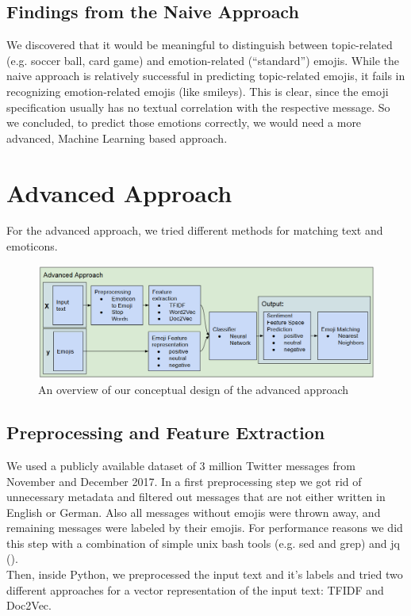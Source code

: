 \documentclass{article}
\begin{document}
\subsection{Findings from the Naive Approach}
We discovered that it would be meaningful to distinguish between topic-related (e.g. soccer ball, card game) and emotion-related (“standard”) emojis. While the naive approach is relatively successful in predicting topic-related emojis, it fails in recognizing emotion-related emojis (like smileys). This is clear, since the emoji specification usually has no textual correlation with the respective message. So we concluded, to predict those emotions correctly, we would need a more advanced, Machine Learning based approach.

\section{Advanced Approach}
For the advanced approach, we tried different methods for matching text and emoticons.

\begin{figure}[h!]
\centering
\includegraphics[scale=0.4]{images/advancedApproachOutline.png}
\caption{An overview of our conceptual design of the advanced approach}
\label{fig:merged_approach}
\end{figure}

\subsection{Preprocessing and Feature Extraction}
We used a publicly available dataset of 3 million Twitter messages from November and December 2017. In a first preprocessing step we got rid of unnecessary metadata and filtered out messages that are not either written in English or German. Also all messages without emojis were thrown away, and remaining messages were labeled by their emojis. For performance reasons we did this step with a combination of simple unix bash tools (e.g. sed and grep) and jq (\citep{jq}). \\
Then, inside Python, we preprocessed the input text and it's labels and tried two different approaches for a vector representation of the input text: TFIDF and Doc2Vec.
\end{document}
